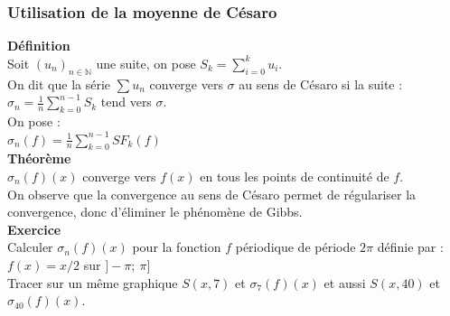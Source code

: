 \documentclass[a4paper,11pt]{book}
\begin{document}
\subsubsection{Utilisation de la moyenne de C\'esaro}
{\bf D\'efinition} \\
Soit $(u_n)_{n \in \mathbb N}$ une suite, on pose $S_k=\sum_{i=0}^{k}u_i$.\\
 On dit que la s\'erie $\sum u_n$ converge vers $\sigma$ au sens 
de C\'esaro si la suite :\\
$\sigma_n=\frac{1}{n}\sum_{k=0}^{n-1}S_k$  tend vers $\sigma$.\\
On pose :\\
$\sigma_n(f)=\frac{1}{n}\sum_{k=0}^{n-1}SF_k(f)$\\
{\bf Th\'eor\`eme}\\
$\sigma_n(f)(x)$ converge vers $f(x)$ en tous les points de continuit\'e de 
$f$.\\
On observe que la convergence au sens de C\'esaro permet de r\'egulariser la 
convergence, donc d'\'eliminer le ph\'enom\`ene de Gibbs.\\
{\bf Exercice}\\
Calculer $\sigma_n(f)(x)$ pour la fonction $f$ 
p\'eriodique de p\'eriode $2 \pi$  d\'efinie  par :
$f(x)=x/2$ sur $]-\pi;\ \pi]$\\
Tracer sur un m\^eme graphique $S(x,7)$ et $\sigma_7(f)(x)$ et aussi
 $S(x,40)$ et $\sigma_{40}(f)(x)$.\\
\end{document}
